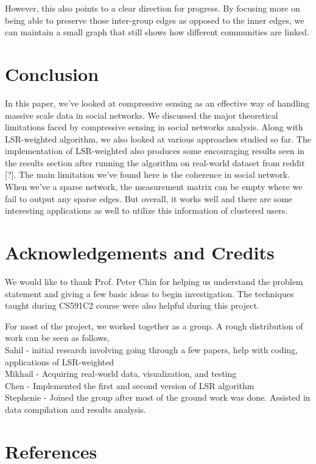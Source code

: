 \documentclass{article}
\begin{document}
However, this also points to a clear direction for progress. By focusing more on being able to preserve those inter-group edges as opposed to the inner edges, we can maintain a small graph that still shows how different communities are linked.

\section{Conclusion}
In this paper, we've looked at compressive sensing as an effective way of handling massive scale data in social
networks. We discussed the major theoretical limitations faced by compressive sensing in social networks analysis. Along
with LSR-weighted algorithm, we also looked at various approaches studied so far. The implementation of LSR-weighted
also produces some encouraging results seen in the results section after running the algorithm on real-world dataset
from reddit [?]. The main limitation we've found here is the
coherence in social network. When we've a sparse network, the measurement matrix can be empty where we fail to output
any sparse edges. But overall, it works well and there are some interesting applications as well to utilize this
information of clustered users. 

\section{Acknowledgements and Credits}
We would like to thank Prof. Peter Chin for helping us understand the problem statement and giving a few basic ideas to
begin investigation. The techniques taught during CS591C2 course were also helpful during this project. 

For most of the project, we worked together as a group. A rough distribution of work can be seen as follows, \\
Sahil - initial research involving going through a few papers, help with coding, applications of LSR-weighted \\
Mikhail - Acquiring real-world data, visualization, and testing\\
Chen - Implemented the first and second version of LSR algorithm \\
Stephenie - Joined the group after most of the ground work was done. Assisted in data compilation and results analysis.

\section*{References}
\small
\end{document}
